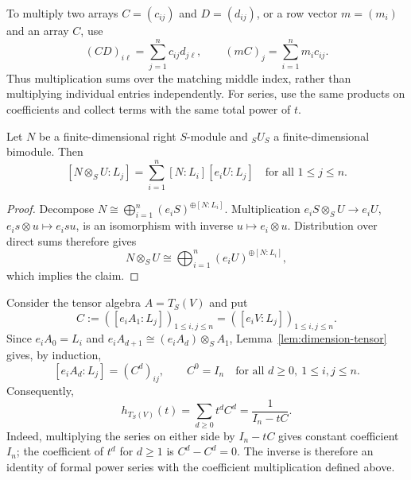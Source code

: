 To multiply two arrays $C=(c_{ij})$ and $D=(d_{ij})$, or a row vector $m=(m_i)$ and an array $C$, use
\[
(CD)_{i\ell}=\sum_{j=1}^n c_{ij}d_{j\ell},
\qquad (mC)_j=\sum_{i=1}^n m_i c_{ij}.
\]
Thus multiplication sums over the matching middle index, rather than multiplying individual entries independently.
For series, use the same products on coefficients and collect terms with the same total power of $t$.

\begin{lemma}\label{lem:dimension-tensor}\label{lem:hilbert-tensor}
Let $N$ be a finite-dimensional right $S$-module and ${}_SU_S$ a finite-dimensional bimodule.
Then
\[
[N\otimes_S U:L_j]
=\sum_{i=1}^n[N:L_i][e_iU:L_j]
\quad\text{for all }1\leq j\leq n.
\]
\end{lemma}

\begin{proof}
Decompose $N\cong\bigoplus_{i=1}^n(e_iS)^{\oplus[N:L_i]}$.
Multiplication $e_iS\otimes_S U\to e_iU$, $e_is\otimes u\mapsto e_isu$, is an isomorphism with inverse $u\mapsto e_i\otimes u$.
Distribution over direct sums therefore gives
\[
N\otimes_S U\cong\bigoplus_{i=1}^n(e_iU)^{\oplus[N:L_i]},
\]
which implies the claim.
\end{proof}

\begin{example}\label{ex:hilbert-tensor-algebra}
Consider the tensor algebra $A=T_S(V)$ and put 
\[C:=([e_iA_1:L_j])_{1\leq i,j\leq n}=([e_iV:L_j])_{1\leq i,j\leq n}.\]
Since $e_iA_0=L_i$ and $e_iA_{d+1}\cong(e_iA_d)\otimes_S A_1$, Lemma~\ref{lem:dimension-tensor} gives, by induction,
\[
[e_iA_d:L_j]=(C^d)_{ij},
\qquad C^0=I_n
\quad\text{for all }d\geq0,\ 1\leq i,j\leq n.
\]
Consequently,
\begin{equation}\label{eq:hilbert-tensor-algebra}
h_{T_S(V)}(t)=\sum_{d\geq0}t^dC^d=\frac{1}{I_n-tC}.
\end{equation}
Indeed, multiplying the series on either side by $I_n-tC$ gives constant coefficient $I_n$; the coefficient of $t^d$ for $d\geq1$ is $C^d-C^d=0$.
The inverse is therefore an identity of formal power series with the coefficient multiplication defined above.
\end{example}

